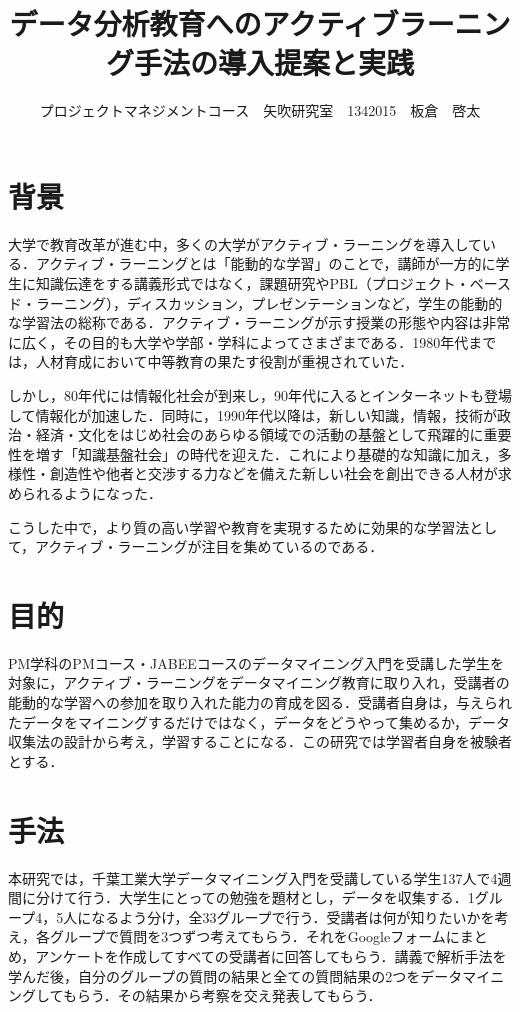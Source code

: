 \documentclass[uplatex,twocolumn,dvipdfmx]{jsarticle}
\title{\vspace{-5mm}\fontsize{14pt}{0pt}\selectfont  データ分析教育へのアクティブラーニング手法の導入提案と実践}
\author{\normalsize プロジェクトマネジメントコース　矢吹研究室　1342015　板倉　啓太}
\date{}
\begin{document}
\fontsize{10.5pt}{\baselineskip}\selectfont
\maketitle




\section{背景}

大学で教育改革が進む中，多くの大学がアクティブ・ラーニングを導入している．アクティブ・ラーニングとは「能動的な学習」のことで，講師が一方的に学生に知識伝達をする講義形式ではなく，課題研究やPBL（プロジェクト・ベースド・ラーニング），ディスカッション，プレゼンテーションなど，学生の能動的な学習法の総称である．アクティブ・ラーニングが示す授業の形態や内容は非常に広く，その目的も大学や学部・学科によってさまざまである．1980年代までは，人材育成において中等教育の果たす役割が重視されていた．

しかし，80年代には情報化社会が到来し，90年代に入るとインターネットも登場して情報化が加速した\cite{a}．同時に，1990年代以降は，新しい知識，情報，技術が政治・経済・文化をはじめ社会のあらゆる領域での活動の基盤として飛躍的に重要性を増す「知識基盤社会」の時代を迎えた．これにより基礎的な知識に加え，多様性・創造性や他者と交渉する力などを備えた新しい社会を創出できる人材が求められるようになった．

こうした中で，より質の高い学習や教育を実現するために効果的な学習法として，アクティブ・ラーニングが注目を集めているのである．




\section{目的}

PM学科のPMコース・JABEEコースのデータマイニング入門を受講した学生を対象に，アクティブ・ラーニングをデータマイニング教育に取り入れ，受講者の能動的な学習への参加を取り入れた能力の育成を図る．受講者自身は，与えられたデータをマイニングするだけではなく，データをどうやって集めるか，データ収集法の設計から考え，学習することになる\cite{b}．この研究では学習者自身を被験者とする．



\section{手法}

本研究では，千葉工業大学データマイニング入門を受講している学生137人で4週間に分けて行う．大学生にとっての勉強を題材とし，データを収集する．1グループ4，5人になるよう分け，全33グループで行う．受講者は何が知りたいかを考え，各グループで質問を3つずつ考えてもらう．それをGoogleフォームにまとめ，アンケートを作成してすべての受講者に回答してもらう．講義で解析手法を学んだ後，自分のグループの質問の結果と全ての質問結果の2つをデータマイニングしてもらう．その結果から考察を交え発表してもらう．
\end{document}
